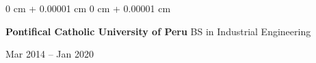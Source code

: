 \documentclass[10pt, letterpaper]{article}
\newenvironment{highlights}{
    \begin{itemize}[
        topsep=0.10 cm,
        parsep=0.10 cm,
        partopsep=0pt,
        itemsep=0pt,
        leftmargin=0 cm + 10pt
    ]
}{
    \end{itemize}
} %
\newenvironment{onecolentry}{
    \begin{adjustwidth}{
        0 cm + 0.00001 cm
    }{
        0 cm + 0.00001 cm
    }
}{
    \end{adjustwidth}
} %
\newenvironment{twocolentry}[2][]{
    \onecolentry
    \def\secondColumn{#2}
    \setcolumnwidth{\fill, 4.5 cm}
    \begin{paracol}{2}
}{
    \switchcolumn \raggedleft \secondColumn
    \end{paracol}
    \endonecolentry
} %
\begin{document}
\begin{twocolentry}{Mar 2014 – Jan 2020}
    \small \textbf{Pontifical Catholic University of Peru} \textbar BS in Industrial Engineering
\end{twocolentry}










        




    



        

\end{document}
